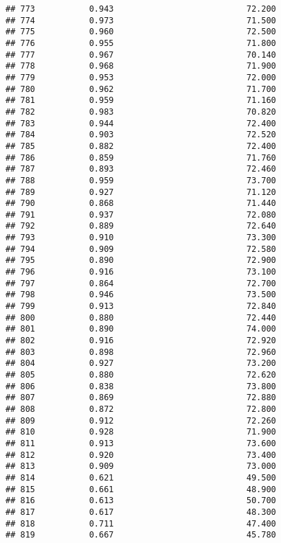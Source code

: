\documentclass[
]{article}
\begin{document}
\begin{verbatim}
## 773           0.943                           72.200
## 774           0.973                           71.500
## 775           0.960                           72.500
## 776           0.955                           71.800
## 777           0.967                           70.140
## 778           0.968                           71.900
## 779           0.953                           72.000
## 780           0.962                           71.700
## 781           0.959                           71.160
## 782           0.983                           70.820
## 783           0.944                           72.400
## 784           0.903                           72.520
## 785           0.882                           72.400
## 786           0.859                           71.760
## 787           0.893                           72.460
## 788           0.959                           73.700
## 789           0.927                           71.120
## 790           0.868                           71.440
## 791           0.937                           72.080
## 792           0.889                           72.640
## 793           0.910                           73.300
## 794           0.909                           72.580
## 795           0.890                           72.900
## 796           0.916                           73.100
## 797           0.864                           72.700
## 798           0.946                           73.500
## 799           0.913                           72.840
## 800           0.880                           72.440
## 801           0.890                           74.000
## 802           0.916                           72.920
## 803           0.898                           72.960
## 804           0.927                           73.200
## 805           0.880                           72.620
## 806           0.838                           73.800
## 807           0.869                           72.880
## 808           0.872                           72.800
## 809           0.912                           72.260
## 810           0.928                           71.900
## 811           0.913                           73.600
## 812           0.920                           73.400
## 813           0.909                           73.000
## 814           0.621                           49.500
## 815           0.661                           48.900
## 816           0.613                           50.700
## 817           0.617                           48.300
## 818           0.711                           47.400
## 819           0.667                           45.780

\end{verbatim}
\end{document}
